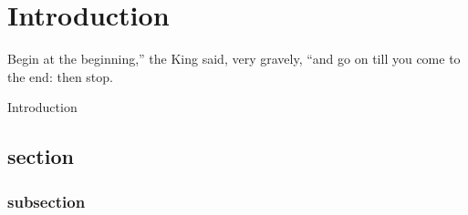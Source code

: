 \chapter{Introduction} \label{ch: introduction}

\begin{chapterquote}
  Begin at the beginning,'' the King said, very gravely,
  ``and go on till you come to the end: then stop.
\end{chapterquote}

Introduction

\section{section}
\subsection{subsection}





\cleardoublepage
